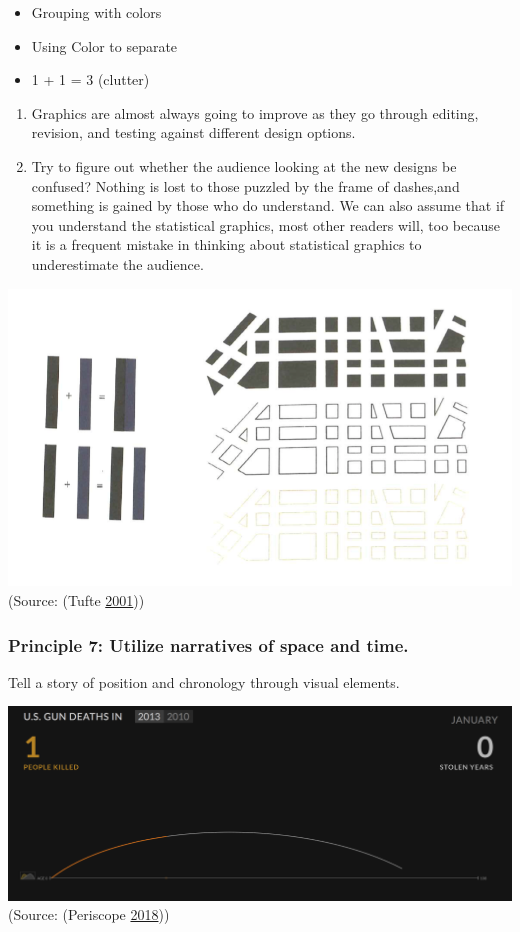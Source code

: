 \documentclass[]{book}
\providecommand{\tightlist}{%
  \setlength{\itemsep}{0pt}\setlength{\parskip}{0pt}}
\begin{document}
\begin{itemize}
\tightlist
\item
  Grouping with colors
\item
  Using Color to separate
\item
  1 + 1 = 3 (clutter)
\end{itemize}

\begin{enumerate}
\def\labelenumi{\arabic{enumi}.}
\setcounter{enumi}{1}
\item
  Graphics are almost always going to improve as they go through
  editing, revision, and testing against different design options.
\item
  Try to figure out whether the audience looking at the new designs be
  confused? Nothing is lost to those puzzled by the frame of dashes,and
  something is gained by those who do understand. We can also assume
  that if you understand the statistical graphics, most other readers
  will, too because it is a frequent mistake in thinking about
  statistical graphics to underestimate the audience.
\end{enumerate}

\includegraphics{images/Tufte_figure10.png} (Source: (Tufte
\protect\hyperlink{ref-Tufte_2001}{2001}))

\subsubsection{Principle 7: Utilize narratives of space and
time.}\label{principle-7-utilize-narratives-of-space-and-time.}

Tell a story of position and chronology through visual elements.

\includegraphics{images/Tufte_figure11.png} (Source: (Periscope
\protect\hyperlink{ref-narratives_2017}{2018}))
\end{document}
